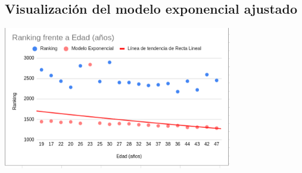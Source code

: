 \documentclass[12pt]{article}
\begin{document}
\vspace{1cm}
\subsection*{Visualización del modelo exponencial ajustado}

\vspace{0.5cm}

\begin{center}
    \includegraphics[width=0.75\textwidth]{nubeExponencial.png}
\end{center}
\end{document}
